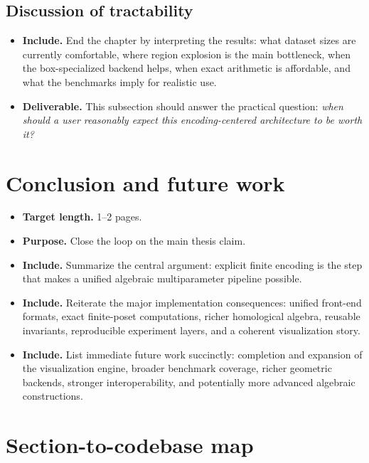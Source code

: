 \documentclass[11pt]{article}
\newenvironment{plan}{\begin{itemize}[leftmargin=1.6em,itemsep=0.35em,topsep=0.25em]}{\end{itemize}}
\newcommand{\target}[1]{\item \textbf{Target length.} #1}
\newcommand{\purpose}[1]{\item \textbf{Purpose.} #1}
\newcommand{\includeitems}[1]{\item \textbf{Include.} #1}
\newcommand{\deliverable}[1]{\item \textbf{Deliverable.} #1}
\begin{document}
\subsection{Discussion of tractability}

\begin{plan}
    \includeitems{End the chapter by interpreting the results: what dataset sizes are currently comfortable, where region explosion is the main bottleneck, when the box-specialized backend helps, when exact arithmetic is affordable, and what the benchmarks imply for realistic use.}
    \deliverable{This subsection should answer the practical question: \emph{when should a user reasonably expect this encoding-centered architecture to be worth it?}}
\end{plan}

\section{Conclusion and future work}\label{sec:conclusion}

\begin{plan}
    \target{1--2 pages.}
    \purpose{Close the loop on the main thesis claim.}
    \includeitems{Summarize the central argument: explicit finite encoding is the step that makes a unified algebraic multiparameter pipeline possible.}
    \includeitems{Reiterate the major implementation consequences: unified front-end formats, exact finite-poset computations, richer homological algebra, reusable invariants, reproducible experiment layers, and a coherent visualization story.}
    \includeitems{List immediate future work succinctly: completion and expansion of the visualization engine, broader benchmark coverage, richer geometric backends, stronger interoperability, and potentially more advanced algebraic constructions.}
\end{plan}

\appendix

\section{Section-to-codebase map}\label{app:code-map}
\end{document}
